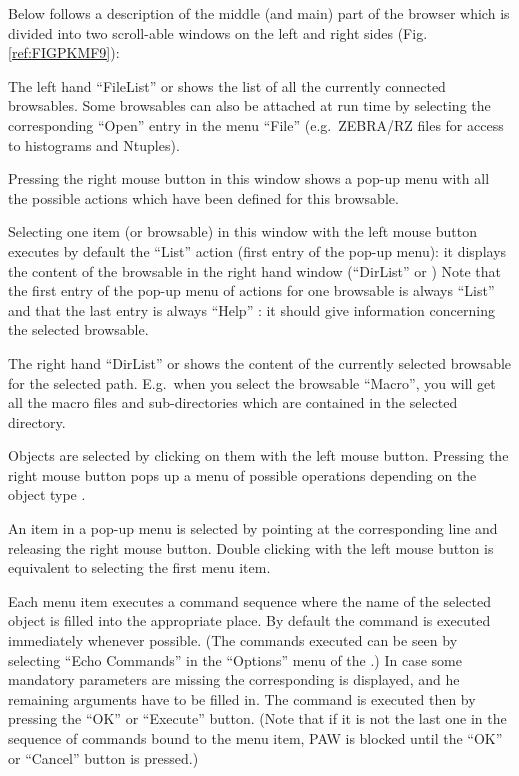 Below follows a description of the middle (and main) part of the browser 
which is divided into two scroll-able windows on the left and right sides
(Fig. \ref{ref:FIGPKMF9}):
\begin{UL}
\item
  The left hand ``FileList'' or \BW{}  shows 
  the list of all the currently connected browsables.  
  Some browsables can also be attached at run time by 
  selecting the corresponding ``Open'' entry in the menu ``File'' (e.g.\ 
  ZEBRA/RZ files for access to histograms and Ntuples). 

  Pressing the right mouse button in this window shows a pop-up menu with
  all the possible actions which have been defined for this browsable. 

  Selecting one item (or browsable) in this window with the left mouse button
  executes by default the ``List'' action (first entry of the pop-up menu):
  it displays the content of the browsable in the right hand window 
  (``DirList'' or \OW{})  \hfill\break
  Note that the first entry of the pop-up menu of actions for one browsable 
  is always ``List'' and that the last entry is always ``Help'' : it should 
  give information concerning the selected 
  browsable.
\item
  The right hand ``DirList'' or \OW{}  shows 
  the content of the
  currently selected browsable for the selected path.
  E.g.\ when you select the browsable ``Macro'',
  you will get all the macro files and sub-directories which are contained in 
  the selected directory.

  Objects are selected by clicking on them with the left mouse button.
  Pressing the right mouse button pops up a menu of possible operations
  depending on the object type \NbDB{7}.

  An item in a pop-up menu is selected by pointing at the corresponding line
  and releasing the right mouse button.
  Double clicking with the left mouse button is equivalent to selecting
  the first menu item.

  Each menu item executes a command sequence where the name of the
  selected object is filled into the appropriate place.
  By default the command is executed immediately whenever possible.
  (The commands executed can be seen by selecting ``Echo Commands''
  in the ``Options'' menu of the \EW{}.)
  In case some mandatory parameters are missing the corresponding \CAP{}
  is displayed, and he remaining arguments have to be filled in.
  The command is executed then by pressing the ``OK'' or ``Execute'' button.
  (Note that if it is not the last one in the sequence of 
  commands bound to the menu item, PAW is blocked until the ``OK'' 
  or ``Cancel'' button is pressed.)
\end{UL}

